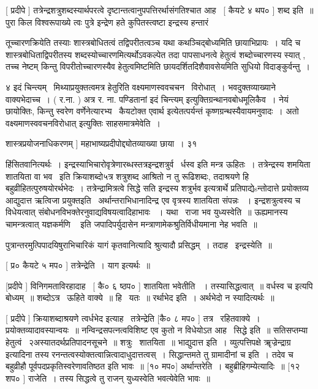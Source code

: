 \documentclass[11pt, openany]{book}
\begin{document}
 [ प्रदीपे ] तत्रेन्द्रशत्रुशब्दस्यार्थपरत्वे
दृष्टान्तत्वानुपपत्तिरर्थासंगतिश्चात आह \textendash\ [ कैयटे ४ थप० ] शब्द इति~॥
पुरा किल विश्वरूपाख्ये त्वः पुत्रे इन्द्रेण हते कुपितस्त्वष्टा इन्द्रस्य
हन्तारं 



तूच्चारणक्रियेति तस्याः शास्त्रबोधितत्वं तद्विपरीतत्वञ्च यथा
कथञ्चिद्बोध्यमिति छायाभिप्रायः~। यदि च शास्त्रबोधिताद्विपरीतस्य
शब्दस्योच्चारणमित्यर्थोऽवकल्पेत तदा पापसाधनत्वे हेतुत्वं शब्दोच्चारणस्य
स्यात् , तच्च नेष्टम् किन्तु विपरीतोच्चारणस्यैव हेतुत्वमिष्टमिति
छायदर्शितदिशैवावसेयमिति सुधियो विदाङ्कुर्वन्तु~। 

४ इदं चिन्त्यम् \textendash\ मिथ्याप्रयुक्तत्वमत्र हेतुरिति वक्ष्यमाणस्ववचचन \textendash\ 
विरोधात्~। भवदुक्तव्याख्याने वाक्यभेदाच्च~। ( र.ना. ) अत्र र. ना.
पण्डितानां {\qt इदं चिन्त्यम्} इत्युक्तिग्रन्थानवबोधमूलिकैव~। नेयं
छायोक्तिः, किन्तु स्वरेण वर्णेनेत्यारभ्य \textendash\ कैयटोक्त एवार्थ
इत्येतत्पर्यन्तं कृष्णग्रन्थस्यैवायमनुवादः~। अतो
{\qt वक्ष्यमाणस्ववचनविरोधात्} इत्युक्तिः साहसमात्रमेवेति~। 

शास्त्रप्रयोजनाधिकरणम् ] महाभाष्यप्रदीपोद्द्योतव्याख्या छाया~। ३१ 



{\qt हिंसितवानित्यर्थः~। 
इन्द्रस्याभिचारोवृत्रेणारब्धस्तत्र}इन्द्रशत्रुर्व \textendash\ र्धस्व इति
मन्त्र ऊहितः~। तत्रेन्द्रस्य शमयिता शातयिता वा भव \textendash\ इति क्रियाशब्दो५त्र
शत्रुशब्द आश्रितो न तु रूढिशब्दः, तदाश्रयणे हि
बहुव्रीहितत्पुरुषयोरर्थभेदः~। तत्रेन्द्रामित्रत्वे सिद्धे सति {\qt इन्द्रस्य
शत्रुर्भव} इत्यत्रार्थे प्रतिपाद्येsन्तोदात्ते प्रयोक्तव्य आद्युदात्त
ऋत्विजा प्रयुक्तइति \textendash\ अर्थान्तराभिधानादिन्द्र एव वृत्रस्य शातयिता संपन्नः
~। इन्द्रशत्रुत्वस्य च विधेयत्वात् संबोधनविभक्तेरनुवाद्यविषयत्वादिहाभावः
~। यथा \textendash\ राजा भव युध्यस्वेति~॥ ऊह्यमानस्य चामन्त्रत्वात् {\qt यज्ञकर्मणि \textendash\ } इति
जपादिपर्युदासेन मन्त्राणामेकश्रुतिर्विधीयमाना नेह भवति~॥ 



पुत्रान्तरमुत्पिपादयिषुराभिचारिकं यागं कृतवानित्यादि श्रुत्यादौ
प्रसिद्धम्~। तदाह \textendash\ इन्द्रस्येति~॥ 

 [ प्र० कैयटे ५ मप० ] तत्रेन्द्रेति~। याग इत्यर्थः~॥ 

 [प्रदीपे ] विनिगमताविरहादाह \textendash\ [ कै० ६ ष्ठप० ] शातयिता भवेतीति
~। तस्यासिद्धत्वात्~॥ {\qt वर्धस्व} च इत्यपि बोध्यम्~॥
शब्दोऽत्र \textendash\ ऊहिते वाक्ये~॥ हि \textendash\ यतः~॥ रर्थाभेद इति~। अर्थभेदो न
स्यादित्यर्थः~॥ 

 [ प्रदीपे ] क्रियाशब्दाश्रयणे त्वर्धभेद इत्याह \textendash\ तत्रेन्द्रेति
[कै० ८ मप० ] तत्र \textendash\ रहितवाक्ये~। प्रयोक्तव्यादावस्यान्वयः~॥
नन्विन्द्रसपत्नत्वविशिष्ट एव कुतो न विधेयोऽत आह \textendash\ सिद्धे इति~॥
सतिसप्तम्या हेतुत्वं \textendash\ २अस्यातदर्थप्रतिपादनसूचने~॥ शत्रुः \textendash\ शातयिता~॥
भाद्युदात्त इति~। व्युत्पत्तिपक्षे {\qt ॠज्रेन्द्राग्र \textendash\ } इत्यादिना
तस्य रनन्तत्वस्योक्तत्वान्नित्वादाधुदात्तत्वस्~। सिद्धान्तमते तु
{\qt ग्रामादीनां च} इति~। तदेव च बहुव्रीहौ पूर्वपदप्रकृतिस्वरेणावतिष्ठत
इति भावः~॥ [१० मप०] अर्थान्तरेति~। बहुब्रीहिगम्येत्यादिः~॥
[१२ शप० ] राजेति~। तस्य सिद्धत्वे तु राजन् युध्यस्वेति
भवत्येवेति भावः~॥ 
\end{document}
